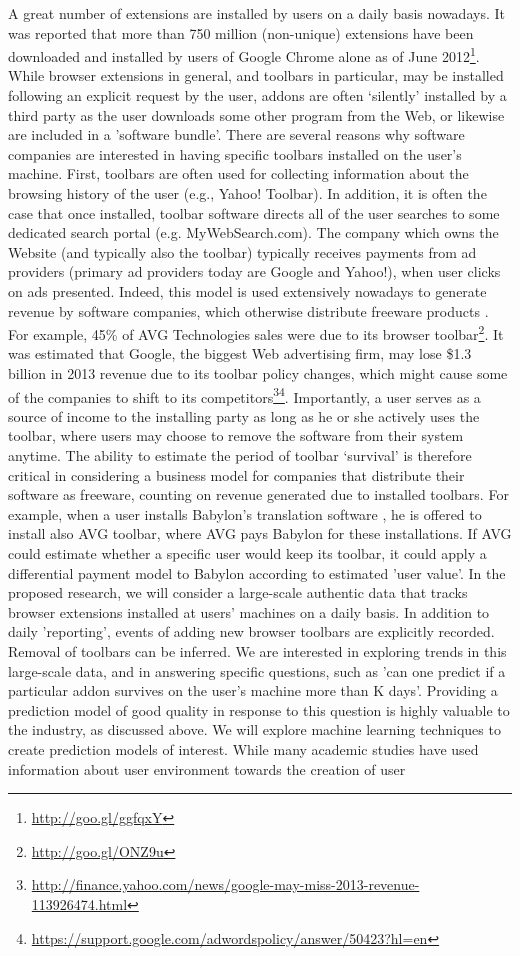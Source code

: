 \documentclass[11pt,oneside]{book}
\begin{document}
A great number of extensions are installed by users on a daily basis nowadays. It was reported that more than 750 million (non-unique) extensions have been downloaded and installed by users of Google Chrome alone as of June 2012\footnote{\url{http://goo.gl/ggfqxY}}. While browser extensions in general, and toolbars in particular, may be installed following an explicit request by the user, addons are often `silently' installed by a third party as the user downloads some other program from the Web, or likewise are included in a 'software bundle'. There are several reasons why software companies are interested in having specific toolbars installed on the user's machine. First, toolbars are often used for collecting information about the browsing history of the user (e.g., Yahoo! Toolbar). In addition, it is often the case that once installed, toolbar software directs all of the user searches to some dedicated search portal (e.g. MyWebSearch.com). 
The company which owns the Website (and typically also the toolbar) typically receives payments from ad providers (primary ad providers today are Google and Yahoo!), when user clicks on ads presented. Indeed, this model is used extensively nowadays to generate revenue by software companies, which otherwise distribute freeware products \citep{leontiadis2012don}. For example, 45\% of AVG Technologies sales were due to its browser toolbar\footnote{\url{http://goo.gl/ONZ9u}}.  It was estimated that Google, the biggest Web advertising firm, may lose \$1.3 billion in 2013 revenue  due to its toolbar policy changes, which might cause some of the companies to shift to its competitors\footnote{\url{http://finance.yahoo.com/news/google-may-miss-2013-revenue-113926474.html}}\footnote{\url{https://support.google.com/adwordspolicy/answer/50423?hl=en}}.
\iffalse 
Importantly, a user serves as a source of income to the installing party as long as he or she actively uses the toolbar, where users may choose to remove the software from their system anytime. The ability to estimate the period of toolbar ‘survival’ is therefore critical in considering a business model for companies that distribute their software as freeware, counting on revenue generated due to installed toolbars. For example, when a user installs Babylon's translation software , he is offered to install also AVG toolbar, where AVG pays Babylon for these installations. If AVG could estimate whether a specific user would keep its toolbar, it could apply a differential payment model to Babylon according to estimated 'user value'.  In the proposed research, we will consider a large-scale authentic data that tracks browser extensions installed at users' machines on a daily basis. In addition to daily 'reporting', events of adding new browser toolbars are explicitly recorded. Removal of toolbars can be inferred. We are interested in exploring trends in this large-scale data, and in answering specific questions, such as 'can one predict if a particular addon survives on the user's machine more than K days'. Providing a prediction model of good quality in response to this question is highly valuable to the industry, as discussed above. We will explore machine learning techniques to create prediction models of interest. While many academic studies have used information about user environment towards the creation of user
\end{document}
